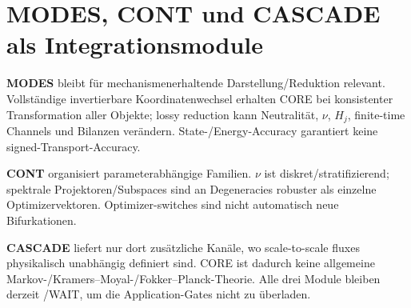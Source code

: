 \section{MODES, CONT und CASCADE als Integrationsmodule}
\textbf{MODES} bleibt für mechanismenerhaltende Darstellung/Reduktion relevant. Vollständige invertierbare Koordinatenwechsel erhalten CORE bei konsistenter Transformation aller Objekte; lossy reduction kann Neutralität, $\nu$, $H_j$, finite-time Channels und Bilanzen verändern. State-/Energy-Accuracy garantiert keine signed-Transport-Accuracy.

\textbf{CONT} organisiert parameterabhängige Familien. $\nu$ ist diskret/stratifizierend; spektrale Projektoren/Subspaces sind an Degeneracies robuster als einzelne Optimizervektoren. Optimizer-switches sind nicht automatisch neue Bifurkationen.

\textbf{CASCADE} liefert nur dort zusätzliche Kanäle, wo scale-to-scale fluxes physikalisch unabhängig definiert sind. CORE ist dadurch keine allgemeine Markov-/Kramers--Moyal-/Fokker--Planck-Theorie. Alle drei Module bleiben derzeit \BLOCKED/WAIT, um die Application-Gates nicht zu überladen.

